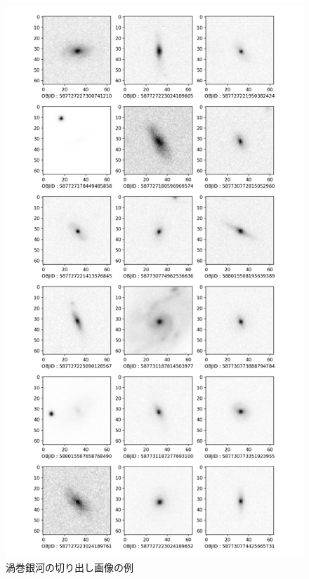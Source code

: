 \documentclass[a4j, 11pt]{jreport}
\begin{document}
\newpage
\begin{figure}[H]
 \centering
 \includegraphics[width=0.5\vsize, keepaspectratio]{images/syuron_4syou_sdss_imgs/spiral_mini.png}
 \caption{渦巻銀河の切り出し画像の例}
 \label{fig:sdss_images_spiral}
\end{figure}
\end{document}
